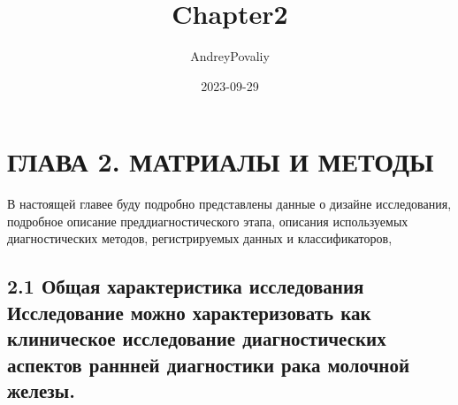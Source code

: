 \documentclass[
]{article}
\title{Chapter2}
\author{AndreyPovaliy}
\date{2023-09-29}
\begin{document}
\maketitle

\hypertarget{ux433ux43bux430ux432ux430-2.-ux43cux430ux442ux440ux438ux430ux43bux44b-ux438-ux43cux435ux442ux43eux434ux44b}{%
\section{ГЛАВА 2. МАТРИАЛЫ И
МЕТОДЫ}\label{ux433ux43bux430ux432ux430-2.-ux43cux430ux442ux440ux438ux430ux43bux44b-ux438-ux43cux435ux442ux43eux434ux44b}}

В настоящей главее буду подробно представлены данные о дизайне
исследования, подробное описание преддиагностического этапа, описания
используемых диагностических методов, регистрируемых данных и
классификаторов,

\hypertarget{ux43eux431ux449ux430ux44f-ux445ux430ux440ux430ux43aux442ux435ux440ux438ux441ux442ux438ux43aux430-ux438ux441ux441ux43bux435ux434ux43eux432ux430ux43dux438ux44f-ux438ux441ux441ux43bux435ux434ux43eux432ux430ux43dux438ux435-ux43cux43eux436ux43dux43e-ux445ux430ux440ux430ux43aux442ux435ux440ux438ux437ux43eux432ux430ux442ux44c-ux43aux430ux43a-ux43aux43bux438ux43dux438ux447ux435ux441ux43aux43eux435-ux438ux441ux441ux43bux435ux434ux43eux432ux430ux43dux438ux435-ux434ux438ux430ux433ux43dux43eux441ux442ux438ux447ux435ux441ux43aux438ux445-ux430ux441ux43fux435ux43aux442ux43eux432-ux440ux430ux43dux43dux43dux435ux439-ux434ux438ux430ux433ux43dux43eux441ux442ux438ux43aux438-ux440ux430ux43aux430-ux43cux43eux43bux43eux447ux43dux43eux439-ux436ux435ux43bux435ux437ux44b.}{%
\subsection{2.1 Общая характеристика исследования Исследование можно
характеризовать как клиническое исследование диагностических аспектов
раннней диагностики рака молочной
железы.}\label{ux43eux431ux449ux430ux44f-ux445ux430ux440ux430ux43aux442ux435ux440ux438ux441ux442ux438ux43aux430-ux438ux441ux441ux43bux435ux434ux43eux432ux430ux43dux438ux44f-ux438ux441ux441ux43bux435ux434ux43eux432ux430ux43dux438ux435-ux43cux43eux436ux43dux43e-ux445ux430ux440ux430ux43aux442ux435ux440ux438ux437ux43eux432ux430ux442ux44c-ux43aux430ux43a-ux43aux43bux438ux43dux438ux447ux435ux441ux43aux43eux435-ux438ux441ux441ux43bux435ux434ux43eux432ux430ux43dux438ux435-ux434ux438ux430ux433ux43dux43eux441ux442ux438ux447ux435ux441ux43aux438ux445-ux430ux441ux43fux435ux43aux442ux43eux432-ux440ux430ux43dux43dux43dux435ux439-ux434ux438ux430ux433ux43dux43eux441ux442ux438ux43aux438-ux440ux430ux43aux430-ux43cux43eux43bux43eux447ux43dux43eux439-ux436ux435ux43bux435ux437ux44b.}}
\end{document}
